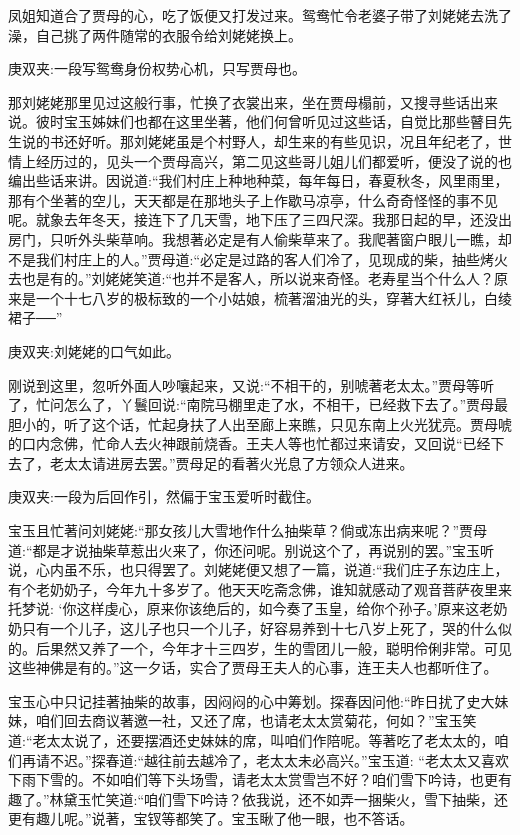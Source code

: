 \begin{parag}
    凤姐知道合了贾母的心，吃了饭便又打发过来。鸳鸯忙令老婆子带了刘姥姥去洗了澡，自己挑了两件随常的衣服令给刘姥姥换上。\begin{note}庚双夹:一段写鸳鸯身份权势心机，只写贾母也。\end{note}那刘姥姥那里见过这般行事，忙换了衣裳出来，坐在贾母榻前，又搜寻些话出来说。彼时宝玉姊妹们也都在这里坐著，他们何曾听见过这些话，自觉比那些瞽目先生说的书还好听。那刘姥姥虽是个村野人，却生来的有些见识，况且年纪老了，世情上经历过的，见头一个贾母高兴，第二见这些哥儿姐儿们都爱听，便没了说的也编出些话来讲。因说道:“我们村庄上种地种菜，每年每日，春夏秋冬，风里雨里，那有个坐著的空儿，天天都是在那地头子上作歇马凉亭，什么奇奇怪怪的事不见呢。就象去年冬天，接连下了几天雪，地下压了三四尺深。我那日起的早，还没出房门，只听外头柴草响。我想著必定是有人偷柴草来了。我爬著窗户眼儿一瞧，却不是我们村庄上的人。”贾母道:“必定是过路的客人们冷了，见现成的柴，抽些烤火去也是有的。”刘姥姥笑道:“也并不是客人，所以说来奇怪。老寿星当个什么人？原来是一个十七八岁的极标致的一个小姑娘，梳著溜油光的头，穿著大红袄儿，白绫裙子──”\begin{note}庚双夹:刘姥姥的口气如此。\end{note}刚说到这里，忽听外面人吵嚷起来，又说:“不相干的，别唬著老太太。”贾母等听了，忙问怎么了，丫鬟回说:“南院马棚里走了水，不相干，已经救下去了。”贾母最胆小的，听了这个话，忙起身扶了人出至廊上来瞧，只见东南上火光犹亮。贾母唬的口内念佛，忙命人去火神跟前烧香。王夫人等也忙都过来请安，又回说“已经下去了，老太太请进房去罢。”贾母足的看著火光息了方领众人进来。\begin{note}庚双夹:一段为后回作引，然偏于宝玉爱听时截住。\end{note}宝玉且忙著问刘姥姥:“那女孩儿大雪地作什么抽柴草？倘或冻出病来呢？”贾母道:“都是才说抽柴草惹出火来了，你还问呢。别说这个了，再说别的罢。”宝玉听说，心内虽不乐，也只得罢了。刘姥姥便又想了一篇，说道:“我们庄子东边庄上，有个老奶奶子，今年九十多岁了。他天天吃斋念佛，谁知就感动了观音菩萨夜里来托梦说: ‘你这样虔心，原来你该绝后的，如今奏了玉皇，给你个孙子。’原来这老奶奶只有一个儿子，这儿子也只一个儿子，好容易养到十七八岁上死了，哭的什么似的。后果然又养了一个，今年才十三四岁，生的雪团儿一般，聪明伶俐非常。可见这些神佛是有的。”这一夕话，实合了贾母王夫人的心事，连王夫人也都听住了。
\end{parag}


\begin{parag}
    宝玉心中只记挂著抽柴的故事，因闷闷的心中筹划。探春因问他:“昨日扰了史大妹妹，咱们回去商议著邀一社，又还了席，也请老太太赏菊花，何如？”宝玉笑道:“老太太说了，还要摆酒还史妹妹的席，叫咱们作陪呢。等著吃了老太太的，咱们再请不迟。”探春道:“越往前去越冷了，老太太未必高兴。”宝玉道: “老太太又喜欢下雨下雪的。不如咱们等下头场雪，请老太太赏雪岂不好？咱们雪下吟诗，也更有趣了。”林黛玉忙笑道:“咱们雪下吟诗？依我说，还不如弄一捆柴火，雪下抽柴，还更有趣儿呢。”说著，宝钗等都笑了。宝玉瞅了他一眼，也不答话。
\end{parag}


